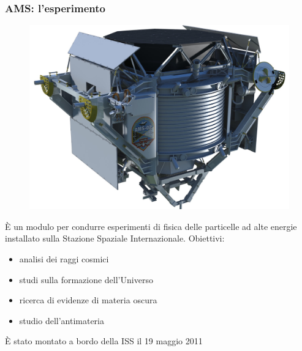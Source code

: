 \documentclass[10pt]{beamer}
\begin{document}
\begin{frame}
  \frametitle{AMS: l'esperimento}
  \begin{figure}
    \centering
    \includegraphics[width=0.3\columnwidth]{ams}
  \end{figure}
  È un modulo per condurre esperimenti di fisica delle particelle ad alte
  energie installato sulla Stazione Spaziale Internazionale.  Obiettivi:
  \begin{itemize}
  \item analisi dei raggi cosmici
  \item studi sulla formazione dell'Universo
  \item ricerca di evidenze di materia oscura
  \item studio dell'antimateria
  \end{itemize}
  È stato montato a bordo della ISS il 19 maggio 2011
\end{frame}
\end{document}
